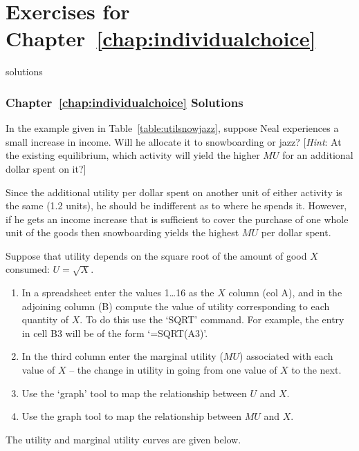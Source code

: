 \newpage
\section*{Exercises for Chapter~\ref{chap:individualchoice}}

\begin{Filesave}{solutions}
\subsubsection*{Chapter~\ref{chap:individualchoice} Solutions}
\end{Filesave}

\begin{enumialphparenastyle}

\begin{econex}\label{ex:ch6ex1}
In the example given in Table~\ref{table:utilsnowjazz}, suppose Neal experiences a small increase in income. Will he allocate it to snowboarding or jazz? [\textit{Hint}: At the existing equilibrium, which activity will yield the higher $MU$ for an additional dollar spent on it?]
\begin{econsolution}
Since the additional utility per dollar spent on another unit of either activity is the same (1.2 units), he should be indifferent as to where he spends it. However, if he gets an income increase that is sufficient to cover the purchase of one whole unit of the goods then snowboarding yields the highest $MU$ per dollar spent.

\end{econsolution}
\end{econex}

\begin{econex}\label{ex:ch6ex2}
Suppose that utility depends on the square root of the amount of good $X$ consumed: $U=\sqrt{X}$.
\begin{enumerate}
\item	In a spreadsheet enter the values 1\dots 16 as the $X$ column (col A), and in the adjoining column (B) compute the value of utility corresponding to each quantity of $X$. To do this use the `SQRT' command. For example, the entry in cell B3 will be of the form `=SQRT(A3)'. 
\item	In the third column enter the marginal utility ($MU$) associated with each value of $X$ -- the change in utility in going from one value of $X$ to the next.
\item	Use the `graph' tool to map the relationship between $U$ and $X$. 
\item	Use the graph tool to map the relationship between $MU$ and $X$. 
\end{enumerate}
\begin{econsolution}
The utility and marginal utility curves are given below.


\end{econsolution}
\end{econex}
\end{enumialphparenastyle}
